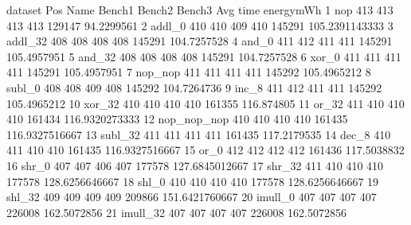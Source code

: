 \begin{filecontents}{dataset}
Pos	Name	Bench1	Bench2	Bench3	Avg	time	energymWh
1	nop	413	413	413	413	129147	94.2299561
2	addl\_0	410	410	409	410	145291	105.2391143333
3	addl\_32	408	408	408	408	145291	104.7257528
4	and\_0	411	412	411	411	145291	105.4957951
5	and\_32	408	408	408	408	145291	104.7257528
6	xor\_0	411	411	411	411	145291	105.4957951
7	nop\_nop	411	411	411	411	145292	105.4965212
8	subl\_0	408	408	409	408	145292	104.7264736
9	inc\_8	411	412	411	411	145292	105.4965212
10	xor\_32	410	410	410	410	161355	116.874805
11	or\_32	411	410	410	410	161434	116.9320273333
12	nop\_nop\_nop	410	410	410	410	161435	116.9327516667
13	subl\_32	411	411	411	411	161435	117.2179535
14	dec\_8	410	411	410	410	161435	116.9327516667
15	or\_0	412	412	412	412	161436	117.5038832
16	shr\_0	407	407	406	407	177578	127.6845012667
17	shr\_32	411	410	410	410	177578	128.6256646667
18	shl\_0	410	410	410	410	177578	128.6256646667
19	shl\_32	409	409	409	409	209866	151.6421760667
20	imull\_0	407	407	407	407	226008	162.5072856
21	imull\_32	407	407	407	407	226008	162.5072856
\end{filecontents}



